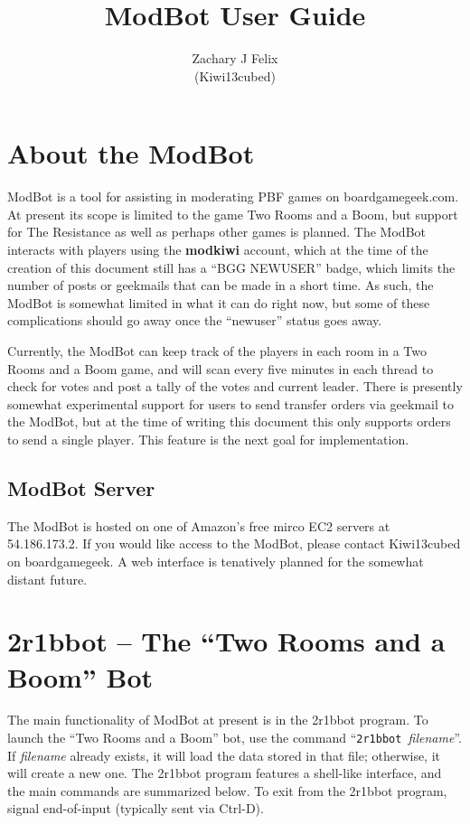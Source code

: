 \documentclass{report}
\begin{document}
\title{ModBot User Guide}
\author{Zachary J Felix\\(Kiwi13cubed)}
\maketitle

\tableofcontents

\chapter*{About the ModBot}
ModBot is a tool for assisting in moderating PBF games on boardgamegeek.com. At present its scope is limited to the game Two Rooms and a Boom, but support for The Resistance as well as perhaps other games is planned. The ModBot interacts with players using the \textbf{modkiwi} account, which at the time of the creation of this document still has a ``BGG NEWUSER'' badge, which limits the number of posts or geekmails that can be made in a short time. As such, the ModBot is somewhat limited in what it can do right now, but some of these complications should go away once the ``newuser'' status goes away.

Currently, the ModBot can keep track of the players in each room in a Two Rooms and a Boom game, and will scan every five minutes in each thread to check for votes and post a tally of the votes and current leader. There is presently somewhat experimental support for users to send transfer orders via geekmail to the ModBot, but at the time of writing this document this only supports orders to send a single player. This feature is the next goal for implementation.

\section*{ModBot Server}
The ModBot is hosted on one of Amazon's free mirco EC2 servers at 54.186.173.2. If you would like access to the ModBot, please contact Kiwi13cubed on boardgamegeek. A web interface is tenatively planned for the somewhat distant future.

\chapter{2r1bbot -- The ``Two Rooms and a Boom'' Bot}
The main functionality of ModBot at present is in the 2r1bbot program. To launch the ``Two Rooms and a Boom'' bot, use the command ``\texttt{2r1bbot }\textit{filename}''. If \textit{filename} already exists, it will load the data stored in that file; otherwise, it will create a new one. The 2r1bbot program features a shell-like interface, and the main commands are summarized below. To exit from the 2r1bbot program, signal end-of-input (typically sent via Ctrl-D).
\end{document}
